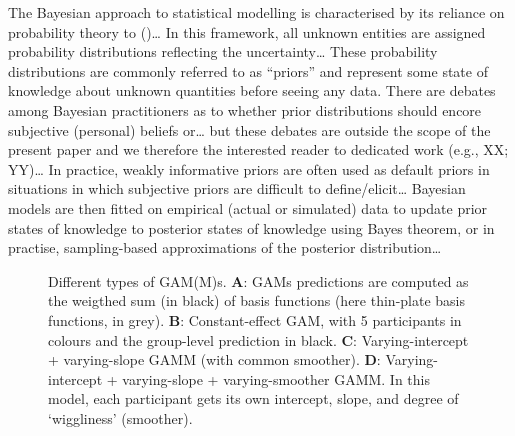 \documentclass[
  doc,
  floatsintext,
  longtable,
  a4paper,
  nolmodern,
  notxfonts,
  notimes,
  donotrepeattitle,
  colorlinks=true,linkcolor=blue,citecolor=blue,urlcolor=blue]{apa7}
\begin{document}
The Bayesian approach to statistical modelling is characterised by its
reliance on probability theory to ()\ldots{} In this framework, all unknown entities are assigned
probability distributions reflecting the uncertainty\ldots{} These
probability distributions are commonly referred to as ``priors'' and
represent some state of knowledge about unknown quantities before seeing
any data. There are debates among Bayesian practitioners as to whether
prior distributions should encore subjective (personal) beliefs
or\ldots{} but these debates are outside the scope of the present paper
and we therefore the interested reader to dedicated work (e.g., XX;
YY)\ldots{} In practice, weakly informative priors are often used as
default priors in situations in which subjective priors are difficult to
define/elicit\ldots{} Bayesian models are then fitted on empirical
(actual or simulated) data to update prior states of knowledge to
posterior states of knowledge using Bayes theorem, or in practise,
sampling-based approximations of the posterior distribution\ldots{}

\begin{figure}[!htb]

\caption{\label{fig-intro-gam}Different types of GAM(M)s. \textbf{A}:
GAMs predictions are computed as the weigthed sum (in black) of basis
functions (here thin-plate basis functions, in grey). \textbf{B}:
Constant-effect GAM, with 5 participants in colours and the group-level
prediction in black. \textbf{C}: Varying-intercept + varying-slope GAMM
(with common smoother). \textbf{D}: Varying-intercept + varying-slope +
varying-smoother GAMM. In this model, each participant gets its own
intercept, slope, and degree of `wiggliness' (smoother).}


\end{figure}%
\end{document}
